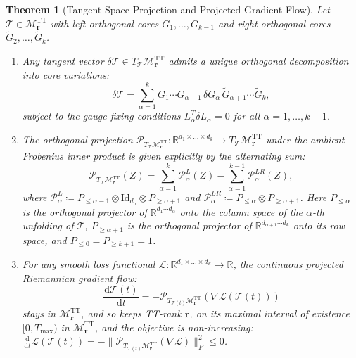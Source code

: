 \documentclass[11pt,a4paper,reqno]{amsart}
\newtheorem{theorem}{Theorem}[section]
\theoremstyle{definition}
\numberwithin{equation}{section}
\providecommand{\R}{\mathbb{R}}
\newcommand{\Id}{\mathrm{Id}}
\newcommand{\dif}{\,\mathrm{d}}
\providecommand{\R}{\mathbb{R}}
\begin{document}
\begin{theorem}[Tangent Space Projection and Projected Gradient Flow]
\label{thm:tt_tangent_proj}
Let $\mathcal{T} \in \mathcal{M}_{\mathbf{r}}^{\mathrm{TT}}$ with left-orthogonal cores $G_1, \dots, G_{k-1}$ and right-orthogonal cores $\widetilde{G}_2, \dots, \widetilde{G}_k$. 
\begin{enumerate}[label=(\roman*)]
    \item Any tangent vector $\delta \mathcal{T} \in T_{\mathcal{T}} \mathcal{M}_{\mathbf{r}}^{\mathrm{TT}}$ admits a unique orthogonal decomposition into core variations:
    \begin{equation}
        \delta \mathcal{T} = \sum_{\alpha=1}^k G_1 \cdots G_{\alpha-1} \, \delta G_\alpha \, \widetilde{G}_{\alpha+1} \cdots \widetilde{G}_k,
    \end{equation}
    subject to the gauge-fixing conditions $L_\alpha^T \delta L_\alpha = 0$ for all $\alpha = 1, \dots, k-1$.
    \item The orthogonal projection $\mathcal{P}_{T_{\mathcal{T}} \mathcal{M}_{\mathbf{r}}^{\mathrm{TT}}} \colon \R^{d_1 \times \dots \times d_k} \to T_{\mathcal{T}} \mathcal{M}_{\mathbf{r}}^{\mathrm{TT}}$ under the ambient Frobenius inner product is given explicitly by the alternating sum:
    \begin{equation}
        \label{eq:tt_proj_formula}
        \mathcal{P}_{T_{\mathcal{T}} \mathcal{M}_{\mathbf{r}}^{\mathrm{TT}}}(Z) = \sum_{\alpha=1}^k \mathcal{P}_{\alpha}^L(Z) - \sum_{\alpha=1}^{k-1} \mathcal{P}_{\alpha}^{LR}(Z),
    \end{equation}
    where $\mathcal{P}_{\alpha}^L \coloneqq P_{\le \alpha-1} \otimes \Id_{d_\alpha} \otimes P_{\ge \alpha+1}$ and $\mathcal{P}_{\alpha}^{LR} \coloneqq P_{\le \alpha} \otimes P_{\ge \alpha+1}$. Here $P_{\le \alpha}$ is the orthogonal projector of $\R^{d_1 \cdots d_\alpha}$ onto the column space of the $\alpha$-th unfolding of $\mathcal{T}$, $P_{\ge \alpha+1}$ is the orthogonal projector of $\R^{d_{\alpha+1} \cdots d_k}$ onto its row space, and $P_{\le 0} = P_{\ge k+1} = 1$.
    \item For any smooth loss functional $\mathcal{L} \colon \R^{d_1 \times \dots \times d_k} \to \R$, the continuous projected Riemannian gradient flow:
    \begin{equation}
        \label{eq:tt_flow}
        \frac{\dif \mathcal{T}(t)}{\dif t} = - \mathcal{P}_{T_{\mathcal{T}(t)} \mathcal{M}_{\mathbf{r}}^{\mathrm{TT}}}\left( \nabla \mathcal{L}(\mathcal{T}(t)) \right)
    \end{equation}
    stays in $\mathcal{M}_{\mathbf{r}}^{\mathrm{TT}}$, and so keeps TT-rank $\mathbf{r}$, on its maximal interval of existence $[0, T_{\max})$ in $\mathcal{M}_{\mathbf{r}}^{\mathrm{TT}}$, and the objective is non-increasing: $\frac{\dif}{\dif t}\mathcal{L}(\mathcal{T}(t)) = -\|\mathcal{P}_{T_{\mathcal{T}(t)} \mathcal{M}_{\mathbf{r}}^{\mathrm{TT}}}(\nabla \mathcal{L})\|_F^2 \le 0$.
\end{enumerate}
\end{theorem}
\end{document}
